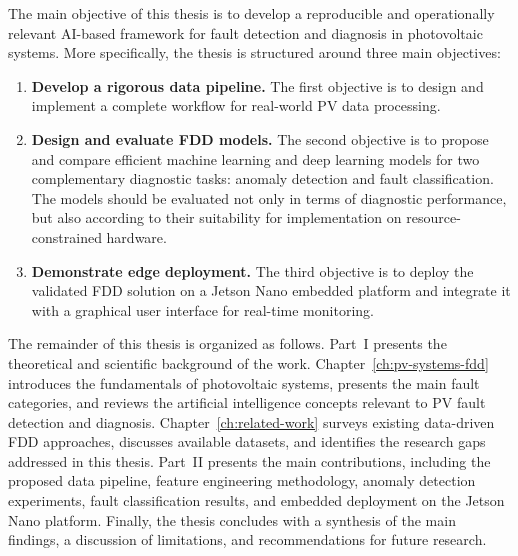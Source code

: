 The main objective of this thesis is to develop a reproducible and operationally relevant AI-based framework for fault detection and diagnosis in photovoltaic systems. More specifically, the thesis is structured around three main objectives:

\begin{enumerate}
    \item \textbf{Develop a rigorous data pipeline.}  
    The first objective is to design and implement a complete workflow for real-world PV data processing.

    \item \textbf{Design and evaluate FDD models.}  
    The second objective is to propose and compare efficient machine learning and deep learning models for two complementary diagnostic tasks: anomaly detection and fault classification. The models should be evaluated not only in terms of diagnostic performance, but also according to their suitability for implementation on resource-constrained hardware.

    \item \textbf{Demonstrate edge deployment.}
    The third objective is to deploy the validated FDD solution on a Jetson Nano embedded platform and integrate it with a graphical user interface for real-time monitoring.
\end{enumerate}

The remainder of this thesis is organized as follows. Part~I presents the theoretical and scientific background of the work. Chapter~\ref{ch:pv-systems-fdd} introduces the fundamentals of photovoltaic systems, presents the main fault categories, and reviews the artificial intelligence concepts relevant to PV fault detection and diagnosis. Chapter~\ref{ch:related-work} surveys existing data-driven FDD approaches, discusses available datasets, and identifies the research gaps addressed in this thesis. Part~II presents the main contributions, including the proposed data pipeline, feature engineering methodology, anomaly detection experiments, fault classification results, and embedded deployment on the Jetson Nano platform. Finally, the thesis concludes with a synthesis of the main findings, a discussion of limitations, and recommendations for future research.